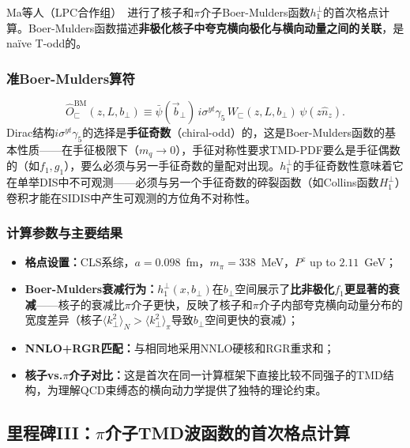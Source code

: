 \documentclass[12pt,a4paper]{ctexart}
\theoremstyle{definition}
\begin{document}
Ma等人（LPC合作组）~\cite{Ma2025BoerMulders}进行了核子和$\pi$介子Boer-Mulders函数$h_1^\perp$的首次格点计算。Boer-Mulders函数描述\textbf{非极化核子中夸克横向极化与横向动量之间的关联}，是na\"ive T-odd的。

\subsubsection{准Boer-Mulders算符}

\begin{equation}
\hat{O}_{\sqsubset}^{\text{BM}}(z, L, b_\perp) \equiv \bar{\psi}(\vec{b}_\perp) \, i\sigma^{yt}\gamma_5 \, W_{\sqsubset}(z, L, b_\perp) \, \psi(z\hat{n}_z).
\label{eq:BM_operator}
\end{equation}
Dirac结构$i\sigma^{yt}\gamma_5$的选择是\textbf{手征奇数}（chiral-odd）的，这是Boer-Mulders函数的基本性质——在手征极限下（$m_q \to 0$），手征对称性要求TMD-PDF要么是手征偶数的（如$f_1, g_1$），要么必须与另一手征奇数的量配对出现。$h_1^\perp$的手征奇数性意味着它在单举DIS中不可观测——必须与另一个手征奇数的碎裂函数（如Collins函数$H_1^\perp$）卷积才能在SIDIS中产生可观测的方位角不对称性。

\subsubsection{计算参数与主要结果}

\begin{itemize}
    \item \textbf{格点设置：}CLS系综，$a = 0.098$~fm，$m_\pi = 338$~MeV，$P^z$ up to $2.11$~GeV；
    \item \textbf{Boer-Mulders衰减行为：}$h_1^\perp(x, b_\perp)$在$b_\perp$空间展示了\textbf{比非极化$f_1$更显著的衰减}——核子的衰减比$\pi$介子更快，反映了核子和$\pi$介子内部夸克横向动量分布的宽度差异（核子$\langle k_\perp^2 \rangle_N > \langle k_\perp^2 \rangle_\pi$导致$b_\perp$空间更快的衰减）；
    \item \textbf{NNLO+RGR匹配：}与\cite{He2024unpolTMD}相同地采用NNLO硬核和RGR重求和；
    \item \textbf{核子vs.$\pi$介子对比：}这是首次在同一计算框架下直接比较不同强子的TMD结构，为理解QCD束缚态的横向动力学提供了独特的理论约束。
\end{itemize}

\subsection{里程碑III：$\pi$介子TMD波函数的首次格点计算~\cite{Chu2023TMDWF}}
\end{document}
